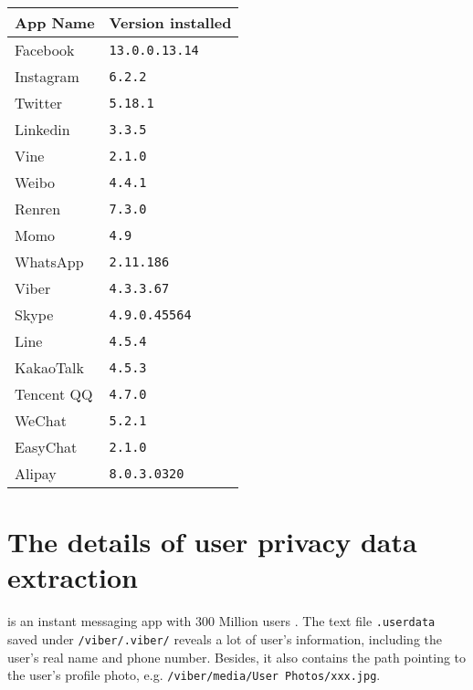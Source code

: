 \documentclass{sig-alternate}
\begin{document}
\begin{table}[htb]
\centering
\newsavebox{\tableboxa}
\label{applist}
\begin{lrbox}{\tableboxa}
\begin{tabular}{l|l} \hline

\textbf{App Name} &\textbf{Version installed}\\ \hline



Facebook &\texttt{13.0.0.13.14}  \\ \hline
Instagram&\texttt{6.2.2}\\ \hline
Twitter  &\texttt{5.18.1}\\ \hline
Linkedin &\texttt{3.3.5}\\ \hline
Vine &\texttt{2.1.0}\\ \hline
Weibo &\texttt{4.4.1}  \\ \hline
Renren & \texttt{7.3.0}\\ \hline
Momo& \texttt{4.9} \\ \hline
WhatsApp &\texttt{2.11.186}\\ \hline
Viber &\texttt{4.3.3.67} \\ \hline
Skype &\texttt{4.9.0.45564}\\ \hline
Line & \texttt{4.5.4} \\ \hline
KakaoTalk &\texttt{4.5.3}\\ \hline
Tencent QQ & \texttt{4.7.0}\\ \hline
WeChat& \texttt{5.2.1}\\ \hline
EasyChat& \texttt{2.1.0}\\ \hline
Alipay &\texttt{8.0.3.0320}\\ \hline

\end{tabular}
\end{lrbox}
\scalebox{0.85}{\usebox{\tableboxa}}
\end{table}



\section{The details of user privacy data extraction }
\label{appendix2}


 is an instant messaging app with 300 Million users \cite{10MessagingApps}. The text file \texttt{.userdata} saved under \texttt{/viber/.viber/} reveals a lot of user's information, including the user's real name and phone number. Besides, it also contains the path pointing to the user's profile photo, e.g. \texttt{/viber/media/User Photos/xxx.jpg}.
\end{document}
